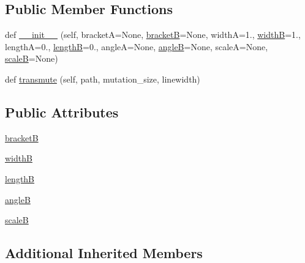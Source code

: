 \subsection*{Public Member Functions}
\begin{DoxyCompactItemize}
\item 
def \hyperlink{classmatplotlib_1_1patches_1_1ArrowStyle_1_1__Bracket_a53b9c57291b367fe3cea2a29766f5934}{\+\_\+\+\_\+init\+\_\+\+\_\+} (self, bracketA=None, \hyperlink{classmatplotlib_1_1patches_1_1ArrowStyle_1_1__Bracket_a277b844a455784e6ffab5dd7cf4686a1}{bracketB}=None, widthA=1., \hyperlink{classmatplotlib_1_1patches_1_1ArrowStyle_1_1__Bracket_a145f84316adeeaabbe60a5dea2281ddf}{widthB}=1., lengthA=0., \hyperlink{classmatplotlib_1_1patches_1_1ArrowStyle_1_1__Bracket_a5fa143f40303b2b4cbcb4a24d233f735}{lengthB}=0., angleA=None, \hyperlink{classmatplotlib_1_1patches_1_1ArrowStyle_1_1__Bracket_ad57a9e23886fca6b0e6c632a509d947d}{angleB}=None, scaleA=None, \hyperlink{classmatplotlib_1_1patches_1_1ArrowStyle_1_1__Bracket_aca029f977c927d90c6801748c231b4c4}{scaleB}=None)
\item 
def \hyperlink{classmatplotlib_1_1patches_1_1ArrowStyle_1_1__Bracket_a56d349780aef30cf06246227080613eb}{transmute} (self, path, mutation\+\_\+size, linewidth)
\end{DoxyCompactItemize}
\subsection*{Public Attributes}
\begin{DoxyCompactItemize}
\item 
\hyperlink{classmatplotlib_1_1patches_1_1ArrowStyle_1_1__Bracket_a277b844a455784e6ffab5dd7cf4686a1}{bracketB}
\item 
\hyperlink{classmatplotlib_1_1patches_1_1ArrowStyle_1_1__Bracket_a145f84316adeeaabbe60a5dea2281ddf}{widthB}
\item 
\hyperlink{classmatplotlib_1_1patches_1_1ArrowStyle_1_1__Bracket_a5fa143f40303b2b4cbcb4a24d233f735}{lengthB}
\item 
\hyperlink{classmatplotlib_1_1patches_1_1ArrowStyle_1_1__Bracket_ad57a9e23886fca6b0e6c632a509d947d}{angleB}
\item 
\hyperlink{classmatplotlib_1_1patches_1_1ArrowStyle_1_1__Bracket_aca029f977c927d90c6801748c231b4c4}{scaleB}
\end{DoxyCompactItemize}
\subsection*{Additional Inherited Members}


